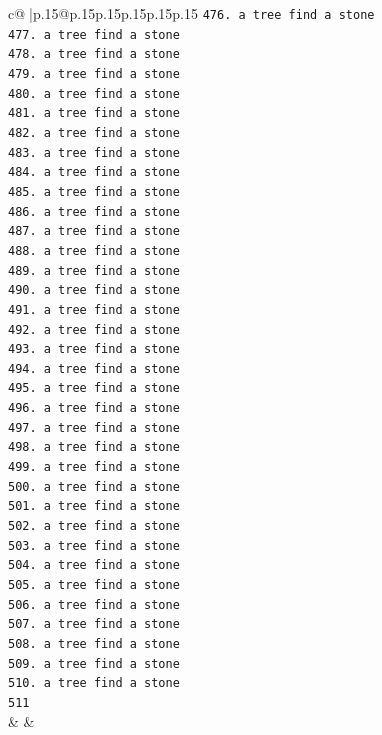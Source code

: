 \documentclass{article}
\begin{document}
{\begin{supertabular}{c@{$\;$}|p{.15\linewidth}@{}p{.15\linewidth}p{.15\linewidth}p{.15\linewidth}p{.15\linewidth}p{.15\linewidth}}
{{{\texttt{476. a tree find a stone} \\
\texttt{477. a tree find a stone} \\
\texttt{478. a tree find a stone} \\
\texttt{479. a tree find a stone} \\
\texttt{480. a tree find a stone} \\
\texttt{481. a tree find a stone} \\
\texttt{482. a tree find a stone} \\
\texttt{483. a tree find a stone} \\
\texttt{484. a tree find a stone} \\
\texttt{485. a tree find a stone} \\
\texttt{486. a tree find a stone} \\
\texttt{487. a tree find a stone} \\
\texttt{488. a tree find a stone} \\
\texttt{489. a tree find a stone} \\
\texttt{490. a tree find a stone} \\
\texttt{491. a tree find a stone} \\
\texttt{492. a tree find a stone} \\
\texttt{493. a tree find a stone} \\
\texttt{494. a tree find a stone} \\
\texttt{495. a tree find a stone} \\
\texttt{496. a tree find a stone} \\
\texttt{497. a tree find a stone} \\
\texttt{498. a tree find a stone} \\
\texttt{499. a tree find a stone} \\
\texttt{500. a tree find a stone} \\
\texttt{501. a tree find a stone} \\
\texttt{502. a tree find a stone} \\
\texttt{503. a tree find a stone} \\
\texttt{504. a tree find a stone} \\
\texttt{505. a tree find a stone} \\
\texttt{506. a tree find a stone} \\
\texttt{507. a tree find a stone} \\
\texttt{508. a tree find a stone} \\
\texttt{509. a tree find a stone} \\
\texttt{510. a tree find a stone} \\
\texttt{511} \\
            }
        }
    }
    & & \\ \\


\end{supertabular}}
\end{document}
